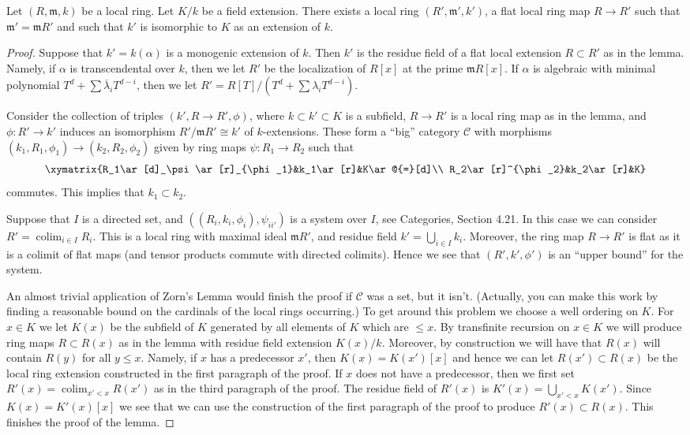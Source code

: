 \begin{lemma}[10.159.1]
Let $(R,\mathfrak m,k)$ be a local ring. Let $K/k$ be a field extension. There exists a local ring $(R',\mathfrak m',k')$, a flat local ring map $R\to R'$ such that $\mathfrak m'=\mathfrak mR'$ and such that $k'$ is isomorphic to $K$ as an extension of $k$.
\end{lemma}
\begin{proof}
Suppose that $k'=k(\alpha)$ is a monogenic extension of $k$. Then $k'$ is the residue field of a flat local extension $R\subset R'$ as in the lemma. Namely, if $\alpha$ is transcendental over $k$, then we let $R'$ be the localization of $R[x]$ at the prime $\mathfrak mR[x]$. If $\alpha$ is algebraic with minimal polynomial $T^d+\sum\overline\lambda_iT^{d-i}$, then we let $R'=R[T]/(T^d+\sum\lambda_iT^{d-i})$.

Consider the collection of triples $(k',R\to R',\phi)$, where $k\subset k'\subset K$ is a subfield, $R\to R'$ is a local ring map as in the lemma, and $\phi:R'\to k'$ induces an isomorphism $R'/\mathfrak mR'\cong k'$ of $k$-extensions. These form a ``big'' category $\mathcal C$ with morphisms $(k_1,R_1,\phi_1)\to(k_2,R_2,\phi_2)$ given by ring maps $\psi:R_1\to R_2$ such that
\[
\xymatrix{R_1\ar[d]_\psi\ar[r]_{\phi_1}&k_1\ar[r]&K\ar@{=}[d]\\
R_2\ar[r]^{\phi_2}&k_2\ar[r]&K}
\]
commutes. This implies that $k_1\subset k_2$.

Suppose that $I$ is a directed set, and $((R_i,k_i,\phi_i),\psi_{ii'})$ is a system over $I$, see Categories, Section 4.21. In this case we can consider $R'=\operatorname{colim}_{i\in I}R_i$. This is a local ring with maximal ideal $\mathfrak mR'$, and residue field $k'=\bigcup_{i\in I}k_i$. Moreover, the ring map $R\to R'$ is flat as it is a colimit of flat maps (and tensor products commute with directed colimits). Hence we see that $(R',k',\phi')$ is an ``upper bound'' for the system.

An almost trivial application of Zorn's Lemma would finish the proof if $\mathcal C$ was a set, but it isn't. (Actually, you can make this work by finding a reasonable bound on the cardinals of the local rings occurring.) To get around this problem we choose a well ordering on $K$. For $x\in K$ we let $K(x)$ be the subfield of $K$ generated by all elements of $K$ which are $\leq x$. By transfinite recursion on $x\in K$ we will produce ring maps $R\subset R(x)$ as in the lemma with residue field extension $K(x)/k$. Moreover, by construction we will have that $R(x)$ will contain $R(y)$ for all $y\leq x$. Namely, if $x$ has a predecessor $x'$, then $K(x)=K(x')[x]$ and hence we can let $R(x')\subset R(x)$ be the local ring extension constructed in the first paragraph of the proof. If $x$ does not have a predecessor, then we first set $R'(x)=\operatorname{colim}_{x'<x}R(x')$ as in the third paragraph of the proof. The residue field of $R'(x)$ is $K'(x)=\bigcup_{x'<x}K(x')$. Since $K(x)=K'(x)[x]$ we see that we can use the construction of the first paragraph of the proof to produce $R'(x)\subset R(x)$. This finishes the proof of the lemma.
\end{proof}

